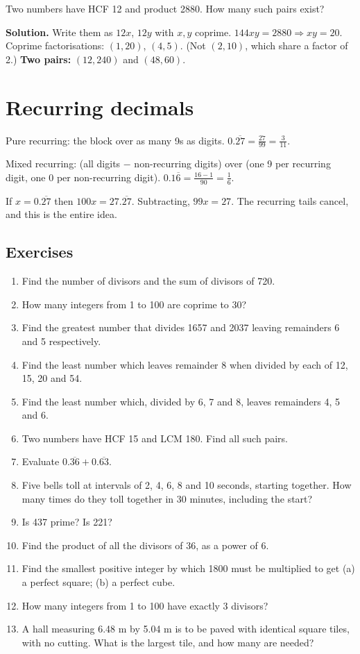 \documentclass[11pt,a4paper,openany]{report}
\newenvironment{exercises}{\subsection*{Exercises \thechapter}\begin{enumerate}[label=\textbf{\thechapter.\arabic*},leftmargin=3.2em]}{\end{enumerate}}
\begin{document}
\begin{example}
Two numbers have HCF 12 and product 2880. How many such pairs exist?

\textbf{Solution.} Write them as $12x$, $12y$ with $x,y$ coprime. $144xy=2880\Rightarrow xy=20$. Coprime factorisations: $(1,20)$, $(4,5)$. (Not $(2,10)$, which share a factor of 2.) \textbf{Two pairs:} $(12,240)$ and $(48,60)$.
\end{example}

\section{Recurring decimals}
\begin{idea}
Pure recurring: the block over as many 9s as digits. $0.\overline{27}=\frac{27}{99}=\frac3{11}$.

Mixed recurring: (all digits $-$ non-recurring digits) over (one 9 per recurring digit, one 0 per non-recurring digit). $0.1\overline{6}=\frac{16-1}{90}=\frac16$.
\end{idea}
\begin{why}
If $x=0.\overline{27}$ then $100x=27.\overline{27}$. Subtracting, $99x=27$. The recurring tails cancel, and this is the entire idea.
\end{why}

\begin{exercises}
\item Find the number of divisors and the sum of divisors of 720.
\item How many integers from 1 to 100 are coprime to 30?
\item Find the greatest number that divides 1657 and 2037 leaving remainders 6 and 5 respectively.
\item Find the least number which leaves remainder 8 when divided by each of 12, 15, 20 and 54.
\item Find the least number which, divided by 6, 7 and 8, leaves remainders 4, 5 and 6.
\item Two numbers have HCF 15 and LCM 180. Find all such pairs.
\item Evaluate $0.\overline{36}+0.\overline{63}$.
\item Five bells toll at intervals of 2, 4, 6, 8 and 10 seconds, starting together. How many times do they toll together in 30 minutes, including the start?
\item Is 437 prime? Is 221?
\item Find the product of all the divisors of 36, as a power of 6.
\item Find the smallest positive integer by which 1800 must be multiplied to get (a) a perfect square; (b) a perfect cube.
\item How many integers from 1 to 100 have exactly 3 divisors?
\item A hall measuring 6.48 m by 5.04 m is to be paved with identical square tiles, with no cutting. What is the largest tile, and how many are needed?
\end{exercises}
\end{document}
